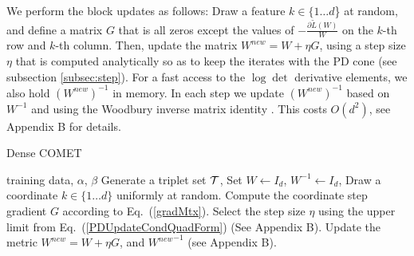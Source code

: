 \documentclass[twoside,11pt]{article}
\newcommand\mat[1]{{#1}}
\newcommand{\T}{{}^\mathsf{T}}
\newcommand{\W}{\mat{W}}
\newcommand{\newW}{{\mat{W^{new}}}}
\newcommand{\tL}{\tilde{L}(\W)}
\newcommand{\cholL}{\mat{L}}
\newcommand{\grd}{\frac{\partial \tL}{\W}}
\renewcommand{\eqref}[1]{Eq.~(\ref{#1})}
\begin{document}
We perform the block updates as follows: %
Draw a feature $k \in \{1 \ldots d$\} at random, and define a matrix $\mat{G}$ that is all zeros except the values of $-\grd$ on the $k$-th row and $k$-th column. Then, update the matrix $\newW = \W +\eta \mat{G}$, using a step size $\eta$ that is computed analytically so as to keep the iterates with the PD cone (see subsection \ref{subsec:step}).
For a fast access to the $\log\det$ derivative elements, we also hold $(\newW)^{-1}$ in memory. In each step we update $(\newW)^{-1}$ based on $\W^{-1}$ and using the Woodbury inverse matrix identity \citep{woodbury1950inverting}. This costs $O(d^2)$, see Appendix B for details.

\begin{algorithm}[th]
   \caption{Dense COMET}
   \label{alg:comet}
\begin{algorithmic}[1]
    training data, $\alpha$, $\beta$
   \STATE Generate a triplet set $\cal{T}$, Set  $\W  \leftarrow I_d$, $\W^{-1}  \leftarrow I_d$, %
   \REPEAT 
   \STATE Draw a coordinate $k \in \{1 \ldots d\}$ uniformly at random. %
   \STATE Compute the coordinate step gradient $\mat{G}$ according to \eqref{gradMtx}.
   \STATE Select the step size $\eta$ using the upper limit from \eqref{PDUpdateCondQuadForm} (See Appendix B).
   \STATE Update the metric $\newW=\W+\eta G$, and $\newW^{-1}$ (see Appendix B).
\end{algorithmic}
\vskip -5pt
\end{algorithm}

\vspace{-6pt}
\end{document}
